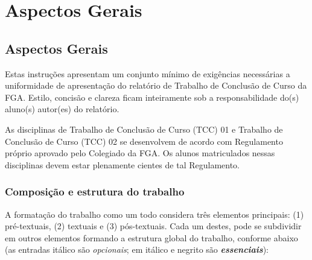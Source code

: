 \part{Aspectos Gerais}

\chapter[Aspectos Gerais]{Aspectos Gerais}

Estas instruções apresentam um conjunto mínimo de exigências necessárias a  uniformidade de apresentação do relatório de Trabalho de Conclusão de Curso da FGA. Estilo, concisão e clareza ficam inteiramente sob a  responsabilidade do(s) aluno(s) autor(es) do relatório.

As disciplinas de Trabalho de Conclusão de Curso (TCC) 01 e Trabalho de Conclusão de Curso (TCC) 02 se desenvolvem de acordo com Regulamento 
próprio aprovado pelo Colegiado da FGA. Os alunos matriculados nessas 
disciplinas devem estar plenamente cientes de tal Regulamento. 

\section{Composição e estrutura do trabalho}

A formatação do trabalho como um todo considera três elementos principais: 
(1) pré-textuais, (2) textuais e (3) pós-textuais. Cada um destes, pode se  subdividir em outros elementos formando a estrutura global do trabalho, conforme abaixo (as entradas itálico são \textit{opcionais}; em itálico e negrito são \textbf{\textit{essenciais}}):

